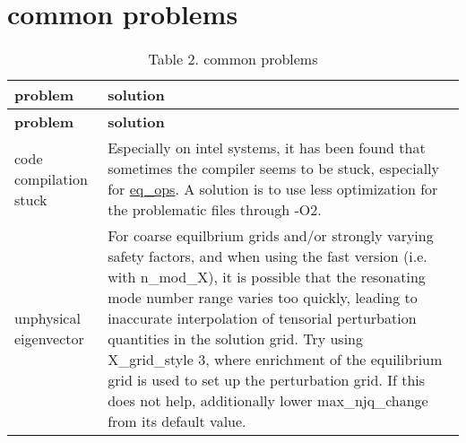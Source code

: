 \hypertarget{page_faq_faq_problems}{}\section{common problems}\label{page_faq_faq_problems}
\hypertarget{page_faq_faq_problems_tab}{}
\tabulinesep=1mm
\begin{longtabu} spread 0pt [c]{*{2}{|X[-1]}|}
\caption{Table 2. common problems}\label{page_faq_faq_problems_tab}\\
\hline
\rowcolor{\tableheadbgcolor}\textbf{ problem }&\textbf{ solution   }\\
\endfirsthead
\hline
\endfoot
\hline
\rowcolor{\tableheadbgcolor}\textbf{ problem }&\textbf{ solution   }\\
\endhead
code compilation stuck &Especially on intel systems, it has been found that sometimes the compiler seems to be stuck, especially for {\ttfamily \hyperlink{namespaceeq__ops}{eq\+\_\+ops}}. A solution is to use less optimization for the problematic files through {\ttfamily -\/\+O2}.   \\
unphysical eigenvector &For coarse equilbrium grids and/or strongly varying safety factors, and when using the fast version (i.\+e. with {\ttfamily n\+\_\+mod\+\_\+X}), it is possible that the resonating mode number range varies too quickly, leading to inaccurate interpolation of tensorial perturbation quantities in the solution grid. Try using {\ttfamily X\+\_\+grid\+\_\+style} 3, where enrichment of the equilibrium grid is used to set up the perturbation grid. If this does not help, additionally lower {\ttfamily max\+\_\+njq\+\_\+change} from its default value.   \\

\end{longtabu}
